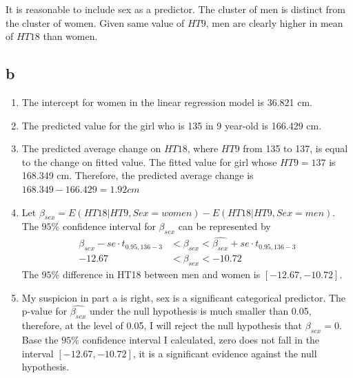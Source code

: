 \documentclass[11pt,letterpaper]{article}
\begin{document}
\noindent It is reasonable to include sex as a predictor. The cluster of men is distinct from the cluster of women. Given same value of $HT9$, men are clearly higher in mean of $HT18$ than women. 

\subsection*{b}
\begin{enumerate}[label=\roman*.]
\item The intercept for women in the linear regression model is 36.821 cm.
\item The predicted value for the girl who is 135 in 9 year-old is 166.429 cm.
\item The predicted average change on $HT18$, where $HT9$ from 135 to  137, is equal to the change on fitted value. The fitted value for girl whose $HT9 = 137$ is 168.349 cm. Therefore, the predicted average change is $168.349 - 166.429 = 1.92 cm$
\item Let $\beta_{sex} = E(HT18 | HT9, Sex=women) - E(HT18 | HT9, Sex=men)$. The $95 \%$ confidence interval for $\beta_{sex}$ can be represented by 
\begin{align*}
\hat{\beta_{sex}} - se \cdot t_{0.95, 136-3} &< \beta_{sex} < \hat{\beta_{sex}} + se \cdot t_{0.95, 136-3} \\
-12.67 &< \beta_{sex} < -10.72
\end{align*}
\noindent The $95 \%$ difference in HT18 between men and women is $[-12.67, -10.72]$. 
\item My suspicion in part a is right, sex is a significant categorical predictor. The p-value for $\hat{\beta_{sex}}$ under the null hypothesis is much smaller than 0.05, therefore, at the level of 0.05, I will reject the null hypothesis that $\beta_{sex} = 0$.  Base the $95 \%$ confidence interval I calculated, zero does not fall in the interval $[-12.67, -10.72]$, it is a significant evidence against the null hypothesis. 
\end{enumerate}
\end{document}

